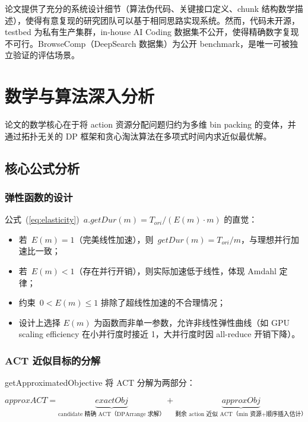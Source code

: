 \documentclass[11pt, a4paper]{article}
\begin{document}
论文提供了充分的系统设计细节（算法伪代码、关键接口定义、chunk 结构数学描述），使得有意复现的研究团队可以基于相同思路实现系统。然而，代码未开源，testbed 为私有生产集群，in-house AI Coding 数据集不公开，使得精确数字复现不可行。BrowseComp（DeepSearch 数据集）为公开 benchmark，是唯一可被独立验证的评估场景。

\section{数学与算法深入分析}

\begin{keyinsight}[TL;DR]
论文的数学核心在于将 action 资源分配问题归约为多维 bin packing 的变体，并通过拓扑无关的 DP 框架和贪心淘汰算法在多项式时间内求近似最优解。
\end{keyinsight}

\subsection{核心公式分析}

\subsubsection{弹性函数的设计}

公式~(\ref{eq:elasticity})~$a.\mathit{getDur}(m) = T_{\mathit{ori}} / (E(m) \cdot m)$ 的直觉：
\begin{itemize}
  \item 若~$E(m) = 1$（完美线性加速），则~$\mathit{getDur}(m) = T_{\mathit{ori}} / m$，与理想并行加速比一致；
  \item 若~$E(m) < 1$（存在并行开销），则实际加速低于线性，体现 Amdahl 定律；
  \item 约束~$0 < E(m) \leq 1$ 排除了超线性加速的不合理情况；
  \item 设计上选择 $E(m)$ 为函数而非单一参数，允许非线性弹性曲线（如 GPU scaling efficiency 在小并行度时接近 1，大并行度时因 all-reduce 开销下降）。
\end{itemize}

\subsubsection{ACT 近似目标的分解}

getApproximatedObjective 将 ACT 分解为两部分：

\begin{mathbox}
\begin{equation}
  \mathit{approxACT} = \underbrace{\mathit{exactObj}}_{\text{candidate 精确 ACT（DPArrange 求解）}} + \underbrace{\mathit{approxObj}}_{\text{剩余 action 近似 ACT（min 资源+顺序插入估计）}}
\end{equation}
\end{mathbox}
\end{document}

